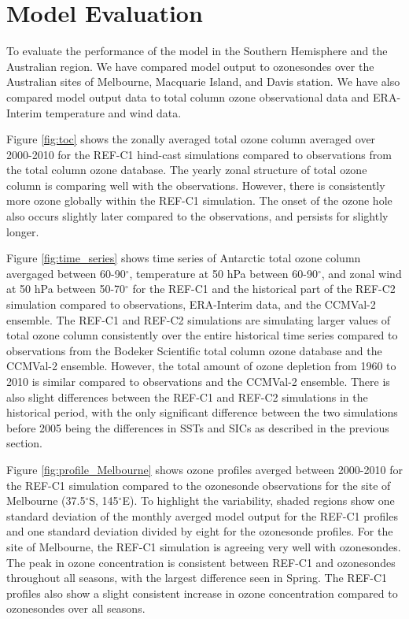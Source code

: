 \section{Model Evaluation}
To evaluate the performance of the model in the Southern Hemisphere and the Australian region. We have compared model output to ozonesondes over the Australian sites of Melbourne, Macquarie Island, and Davis station. We have also compared model output data to total column ozone observational data and ERA-Interim temperature and wind data. 

Figure \ref{fig:toc} shows the zonally averaged total ozone column averaged over 2000-2010 for the REF-C1 hind-cast simulations compared to observations from the total column ozone database. The yearly zonal structure of total ozone column is comparing well with the observations. However, there is consistently more ozone globally within the REF-C1 simulation. The onset of the ozone hole also occurs slightly later compared to the observations, and persists for slightly longer.

Figure \ref{fig:time_series} shows time series of Antarctic total ozone column avergaged between 60-90$^{\circ}$, temperature at 50 hPa between 60-90$^{\circ}$, and zonal wind at 50 hPa between 50-70$^{\circ}$ for the REF-C1 and the historical part of the REF-C2 simulation compared to observations, ERA-Interim data, and the CCMVal-2 ensemble. The REF-C1 and REF-C2 simulations are simulating larger values of total ozone column consistently over the entire historical time series compared to observations from the Bodeker Scientific total column ozone database and the CCMVal-2 ensemble. However, the total amount of ozone depletion from 1960 to 2010 is similar compared to observations and the CCMVal-2 ensemble. There is also slight differences between the REF-C1 and REF-C2 simulations in the historical period, with the only significant difference between the two simulations before 2005 being the differences in SSTs and SICs as described in the previous section.

Figure \ref{fig:profile_Melbourne} shows ozone profiles averged between 2000-2010 for the REF-C1 simulation compared to the ozonesonde observations for the site of Melbourne (37.5$^\circ$S, 145$^\circ$E). To highlight the variability, shaded regions show one standard deviation of the monthly averged model output for the REF-C1 profiles and one standard deviation divided by eight for the ozonesonde profiles. For the site of Melbourne, the REF-C1 simulation is agreeing very well with ozonesondes. The peak in ozone concentration is consistent between REF-C1 and ozonesondes throughout all seasons, with the largest difference seen in Spring. The REF-C1 profiles also show a slight consistent increase in ozone concentration compared to ozonesondes over all seasons.

